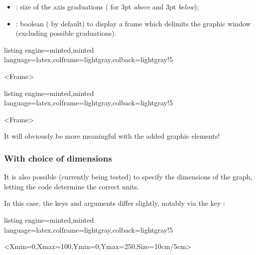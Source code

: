\documentclass[11pt,a4paper]{ltxdoc}
\begin{document}
\smallskip

\begin{itemize}
	\item {}: size of the axis graduations (\MontreCode{3pt} for 3pt \textit{above} and 3pt \textit{below});
	\item {}: boolean ( by default) to display a frame which delimits the graphic window (excluding possible graduations).
\end{itemize}

\begin{tcblisting}{listing engine=minted,minted language=latex,colframe=lightgray,colback=lightgray!5}
\begin{GraphTikz}
	[x=0.075cm,y=0.03cm,Xmin=0,Xmax=160,Xgrid=20,Xgrids=10,
	Origy=250,Ymin=250,Ymax=400,Ygrid=25,Ygrids=5]
	<Frame>
\end{GraphTikz}
\end{tcblisting}

\begin{tcblisting}{listing engine=minted,minted language=latex,colframe=lightgray,colback=lightgray!5}
\begin{GraphTikz}%
	[x=0.9cm,y=0.425cm,Xmin=4,Xmax=20,Origx=4,
	Ymin=40,Ymax=56,Ygrid=2,Ygrids=1,Origy=40]
	<Frame>
\end{GraphTikz}
\end{tcblisting}

It will obviously be more meaningful with the added graphic elements!

\subsubsection{With choice of dimensions}

It is also possible (currently being tested) to specify the dimensions of the graph, letting the code determine the correct units.

In this case, the keys and arguments differ slightly, notably via the key :

\begin{tcblisting}{listing engine=minted,minted language=latex,colframe=lightgray,colback=lightgray!5}
\begin{GraphTikz}%
	[Xgrid=10,Xgrids=5,Ygrid=50,Ygrids=25]
	<Xmin=0,Xmax=100,Ymin=0,Ymax=250,Size={10cm/5cm}>
\end{GraphTikz}
\end{tcblisting}
\end{document}
